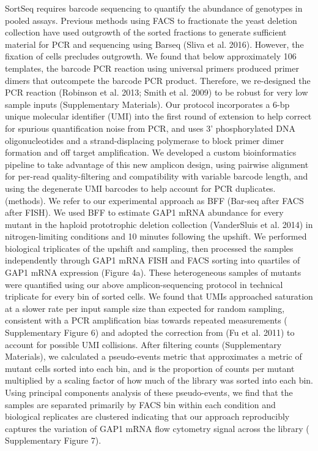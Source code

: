 SortSeq requires barcode sequencing to quantify the abundance of
genotypes in pooled assays. Previous methods using FACS to fractionate
the yeast deletion collection have used outgrowth of the sorted
fractions to generate sufficient material for PCR and sequencing using
Barseq (Sliva et al. 2016).  However, the fixation of cells precludes
outgrowth. We found that below approximately 106 templates, the
barcode PCR reaction using universal primers produced primer dimers
that outcompete the barcode PCR product. Therefore, we re-designed the
PCR reaction  (Robinson et al. 2013; Smith et al. 2009) to be robust
for very low sample inputs (Supplementary Materials). Our protocol
incorporates a 6-bp unique molecular identifier (UMI) into the first
round of extension to help correct for spurious quantification noise
from PCR, and uses 3’ phosphorylated DNA oligonucleotides and a
strand-displacing polymerase to block primer dimer formation and off
target amplification. We developed a custom bioinformatics pipeline to
take advantage of this new amplicon design, using pairwise alignment
for per-read quality-filtering and compatibility with variable barcode
length, and using the degenerate UMI barcodes to help account for PCR
duplicates.  (methods).  We refer to our experimental approach as BFF
(Bar-seq after FACS after FISH).  We used BFF to estimate GAP1 mRNA
abundance for every mutant in the haploid prototrophic deletion
collection (VanderSluis et al. 2014) in nitrogen-limiting conditions
and 10 minutes following the upshift. We performed biological
triplicates of the upshift and sampling, then processed the samples
independently through GAP1 mRNA FISH and FACS sorting into quartiles
of GAP1 mRNA expression (Figure 4a). These heterogeneous samples of
mutants were quantified using our above amplicon-sequencing protocol
in technical triplicate for every bin of sorted cells. We found that
UMIs approached saturation at a slower rate per input sample size than
expected for random sampling, consistent with a PCR amplification bias
towards repeated measurements ( Supplementary Figure 6) and adopted
the correction from (Fu et al. 2011) to account for possible UMI
collisions. After filtering counts (Supplementary Materials), we
calculated a pseudo-events metric that approximates a metric of mutant
cells sorted into each bin, and is the proportion of counts per mutant
multiplied by a scaling factor of how much of the library was sorted
into each bin. Using principal components analysis of these
pseudo-events, we find that the samples are separated primarily by
FACS bin within each condition and biological replicates are clustered
indicating that our approach reproducibly captures the variation of
GAP1 mRNA flow cytometry signal across the library   ( Supplementary
Figure 7).
  

